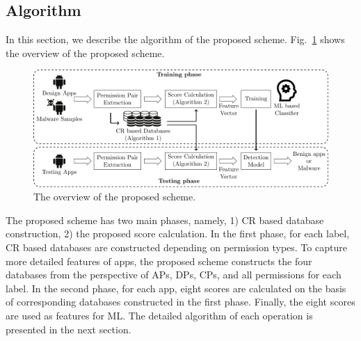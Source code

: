 \documentclass{ieeeaccess}
\newcommand{\myfigurename}{Fig.}
\begin{document}
\subsection{Algorithm}
In this section, we describe the algorithm of the proposed scheme.
\myfigurename~\ref{fig:overview} shows the overview of the proposed scheme.
\begin{figure}[t]
  \centering
  \includegraphics[scale=0.80]{./figures/overview_pair.pdf}
  \caption{The overview of the proposed scheme.}
  \label{fig:overview}
\end{figure}
The proposed scheme has two main phases, namely, 1) CR based database construction, 2) the proposed score calculation.
In the first phase, for each label, CR based databases are constructed depending on permission types.
To capture more detailed features of apps, the proposed scheme constructs the four databases from the perspective of APs, DPs, CPs, and all permissions for each label.
In the second phase, for each app, eight scores are calculated on the basis of corresponding databases constructed in the first phase.
Finally, the eight scores are used as features for ML.
The detailed algorithm of each operation is presented in the next section.

\makeatletter
\newcommand{\multiline}[1]{%
  \begin{tabularx}{\dimexpr\linewidth-\ALG@thistlm}[t]{@{}X@{}}
    #1
  \end{tabularx}
}
\makeatother
\newcommand{\TRAINDATASET}{D_{\mathrm{training}}} %
\newcommand{\PTYPE}{pt} %
\newcommand{\DB}{D^{\PTYPE, l}} %
\newcommand{\DBA}{DB^{\mathrm{android}}} %
\newcommand{\DBD}{DB^{\mathrm{dangerous}}} %
\newcommand{\DBC}{DB^{\mathrm{custom}}} %
\newcommand{\TRAINAPP}[1]{ta_{#1}} %
\newcommand{\TRAINPERMISSIONSET}{TP_{\PTYPE, l}} %
\newcommand{\PERMISSIONSET}[1]{P^{\PTYPE, l}_{#1}} %
\newcommand{\PERMISSIONPAIRSET}[1]{P^{\mathrm{pair}}_{#1}} %
\newcommand{\CRATIO}[1]{cr_{#1}} %
\newcommand{\PAIR}{(p_j, p_k)} %
\end{document}
